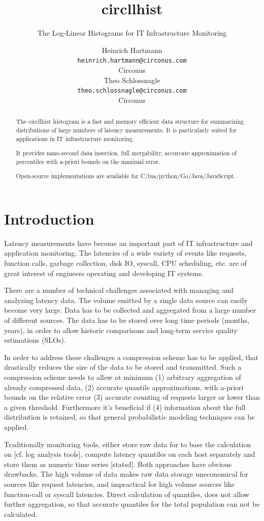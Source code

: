 \documentclass{article}
\title{circllhist}
\subtitle{The Log-Linear Histograms for IT Infrastructure Monitoring}
\author{
  Heinrich Hartmann \\
  \texttt{heinrich.hartmann@circonus.com} \\
  Circonus \\
  \And
  Theo Schlossnagle \\
  \texttt{theo.schlossnagle@circonus.com} \\
  Circonus
}
\theoremstyle{plain}
\theoremstyle{remark}
\begin{document}
\maketitle

\begin{abstract}
  The circllhist histogram is a fast and memory efficient data structure for summarizing distributions of
  large numbers of latency measurements.
  It is particularly suited for applications in IT infrastructure monitoring.

  It provides nano-second data insertion,
  full mergability,
  accurcate approximation of percentiles with a-priori bounds on the maximal error.

  Open-source implementations are available for C/lua/python/Go/Java/JavaScript.
\end{abstract}

\section{Introduction}

Latency measurements have become an important part of IT infrastructure and application monitoring.
The latencies of a wide variety of events like requests, function calls, garbage collection, disk
IO, syscall, CPU scheduling, etc. are of great interest of engineers operating and developing IT systems.

There are a number of technical challenges associated with managing and analyzing latency data.
The volume emitted by a single data source can easily become very large.  Data has to be collected and
aggregated from a large number of different sources.  The data has to be stored over long time
periods (months, years), in order to allow historic comparisons and long-term service quality
estimations (SLOs).

In order to address these challenges a compression scheme has to be applied, that drastically
reduces the size of the data to be stored and transmitted.  Such a compression scheme needs to allow
at minimum (1) arbitrary aggregation of already compressed data, (2) accurate quantile
approximations, with a-priori bounds on the relative error (3) accurate counting of requests larger
or lower than a given threshold. Furthermore it's beneficial if (4) information about the full
distribution is retained, so that general probabilistic modeling techniques can be applied.

Traditionally monitoring tools, either store raw data for to base the calculation on [cf. log analysis tools],
compute latency quantiles on each host separately and store them as numeric time series [statsd].
Both approaches have obvious drawbacks.
The high volume of data makes raw data storage uneconomical for sources like request latencies,
and impractical for high volume sources like function-call or syscall latencies.
Direct calculation of quantiles, does not allow further aggregation, so that accurate quantiles
for the total population can not be calculated.
\end{document}
